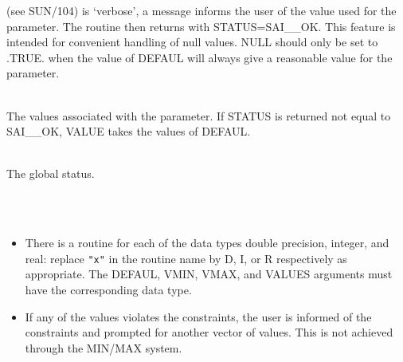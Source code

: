 \documentclass[twoside,11pt]{article}
\newcommand{\latex}[1]{#1}
\newcommand{\sstsubsection}[1]{ \item[{#1}] \mbox{} \\}
\newcommand{\sstnotes}[1]{\item[Notes:] \mbox{} \\[1.3ex] #1}
\newcommand{\sstitemlist}[1]{
  \mbox{} \\
  \vspace{-3.5ex}
  \begin{itemize}
     #1
  \end{itemize}
}
\newcommand{\sstitem}{\item}
\newcommand{\sstsubsection}[1]{\item[{#1}]}
\newcommand{\sstnotes}[1]{\item[Notes:] #1 }
\newcommand{\sstitemlist}[1]{
      \begin{itemize}
         #1
      \end{itemize}
      \\
   }
\newcommand{\sstitem}{\item}
\begin{document}
{{{\latex{ (see SUN/104)} is `verbose',
         a message informs the user of the value used for
         the parameter. The routine then returns with STATUS=SAI\_\_OK. 
         This feature is intended for convenient handling of null values.
         NULL should only be set to .TRUE. when the value of DEFAUL will
         always give a reasonable value for the parameter.
      }
      \sstsubsection{
         VALUES( NVALS ) = ? (Returned)
      }{
         The values associated with the parameter.  If STATUS is
         returned not equal to SAI\_\_OK, VALUE takes the values of
         DEFAUL.
      }
      \sstsubsection{
         STATUS = INTEGER (Given and Returned)
      }{
         The global status.
      }
   }
   \sstnotes{
      \sstitemlist{

         \sstitem
         There is a routine for each of the data types double precision,
         integer, and real: replace {\tt "x"} in the routine name by D, I, or R
         respectively as appropriate.  The DEFAUL, VMIN, VMAX, and VALUES
         arguments must have the corresponding data type.

         \sstitem
         If any of the values violates the constraints, the user is
         informed of the constraints and prompted for another vector of
         values.  This is not achieved through the MIN/MAX system.
      }
   }
}
\end{document}
